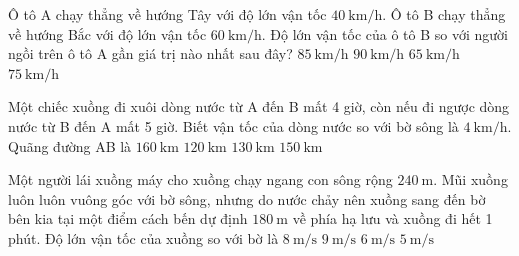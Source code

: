 \begin{ex}
	Ô tô A chạy thẳng về hướng Tây với độ lớn vận tốc $\SI{40}{\kilo\meter/\hour}$. Ô tô B chạy thẳng về hướng Bắc với độ lớn vận tốc $\SI{60}{\kilo\meter/\hour}$. Độ lớn vận tốc của ô tô B so với người ngồi trên ô tô A gần giá trị nào nhất sau đây?	
	\choice
	{$\SI{85}{\kilo\meter/\hour}$}
	{$\SI{90}{\kilo\meter/\hour}$}
	{$\SI{65}{\kilo\meter/\hour}$}
	{\True $\SI{75}{\kilo\meter/\hour}$}
	\loigiai{}
\end{ex}
\begin{ex}
	Một chiếc xuồng đi xuôi dòng nước từ A đến B mất 4 giờ, còn nếu đi ngược dòng nước từ B đến A mất 5 giờ. Biết vận tốc của dòng nước so với bờ sông là $\SI{4}{\kilo\meter/\hour}$. Quãng đường AB là
	\choice
	{\True $\SI{160}{\kilo\meter}$}
	{$\SI{120}{\kilo\meter}$}
	{$\SI{130}{\kilo\meter}$}
	{$\SI{150}{\kilo\meter}$}
	\loigiai{}
\end{ex}
\begin{ex}
	Một người lái xuồng máy cho xuồng chạy ngang con sông rộng $\SI{240}{\meter}$. Mũi xuồng luôn luôn vuông góc với bờ sông, nhưng do nước chảy nên xuồng sang đến bờ bên kia tại một điểm cách bến dự định $\SI{180}{\meter}$ về phía hạ lưu và xuồng đi hết 1 phút. Độ lớn vận tốc của xuồng so với bờ là
	\choice
	{$\SI{8}{\meter/\second}$}
	{$\SI{9}{\meter/\second}$}
	{$\SI{6}{\meter/\second}$}
	{\True $\SI{5}{\meter/\second}$}
	\loigiai{}
\end{ex}

